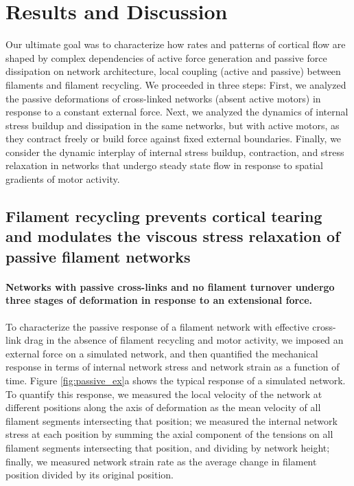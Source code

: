 \documentclass[10pt,letterpaper]{article}
\begin{document}
\section*{Results and Discussion}
Our ultimate goal was to characterize how rates and patterns of cortical flow are shaped by complex dependencies of active force generation and passive force dissipation on network architecture, local coupling (active and passive) between filaments and filament recycling.  We proceeded in three steps:  First, we analyzed the passive deformations of cross-linked networks (absent active motors) in response to a constant external force.  Next, we analyzed the dynamics of internal stress buildup and dissipation in the same networks, but with active motors, as they contract freely or build force against fixed external boundaries. Finally, we consider the dynamic interplay of internal stress buildup, contraction, and stress relaxation in networks that undergo steady state flow in response to spatial gradients of motor activity.

\subsection*{Filament recycling prevents cortical tearing and modulates the viscous stress relaxation of passive filament networks}
 
\paragraph{Networks with passive cross-links and no filament turnover undergo three stages of deformation in response to an extensional force.} 
To characterize the passive response of a filament network with effective cross-link drag in the absence of filament recycling and motor activity, we imposed an external force on a simulated network, and then quantified the mechanical response in terms of internal network stress and network strain as a function of time. Figure \ref{fig:passive_ex}a shows the typical response of a simulated network.  To quantify this response, we measured the local velocity of the network at different positions along the axis of deformation as the mean velocity of all filament segments intersecting that position;  we measured the internal network stress at each position by summing the axial component of the tensions on all filament segments intersecting that position, and dividing by network height;  finally, we measured network strain rate as the average change in filament position divided by its original position.
\end{document}
